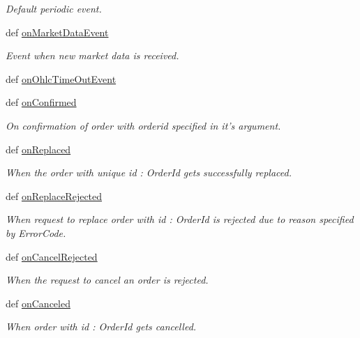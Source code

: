 \begin{DoxyCompactItemize}
\begin{DoxyCompactList}\small\item\em Default periodic event. \end{DoxyCompactList}\item 
def \hyperlink{classmuTradePyBase_1_1CustomStrategy_a918b835dffeef7990e956782842e5343}{on\-Market\-Data\-Event}
\begin{DoxyCompactList}\small\item\em Event when new market data is received. \end{DoxyCompactList}\item 
def \hyperlink{classmuTradePyBase_1_1CustomStrategy_a905f984d6323fafcc385c715441bea27}{on\-Ohlc\-Time\-Out\-Event}
\item 
def \hyperlink{classmuTradePyBase_1_1CustomStrategy_ab64f3133cb5b77c3b1d921759d5911e2}{on\-Confirmed}
\begin{DoxyCompactList}\small\item\em On confirmation of order with orderid specified in it's argument. \end{DoxyCompactList}\item 
def \hyperlink{classmuTradePyBase_1_1CustomStrategy_ad3f6cce49c42ecf283febf72fcaa5931}{on\-Replaced}
\begin{DoxyCompactList}\small\item\em When the order with unique id \-: Order\-Id gets successfully replaced. \end{DoxyCompactList}\item 
def \hyperlink{classmuTradePyBase_1_1CustomStrategy_a90185b4d9a19d02a2d6f3add49367d37}{on\-Replace\-Rejected}
\begin{DoxyCompactList}\small\item\em When request to replace order with id \-: Order\-Id is rejected due to reason specified by Error\-Code. \end{DoxyCompactList}\item 
def \hyperlink{classmuTradePyBase_1_1CustomStrategy_ae9f6ff26aefcfa95d28eb331b2636349}{on\-Cancel\-Rejected}
\begin{DoxyCompactList}\small\item\em When the request to cancel an order is rejected. \end{DoxyCompactList}\item 
def \hyperlink{classmuTradePyBase_1_1CustomStrategy_a5f62cf9ef5b4d4565a9d55ab84ba7ec5}{on\-Canceled}
\begin{DoxyCompactList}\small\item\em When order with id \-: Order\-Id gets cancelled. \end{DoxyCompactList}\item 

\end{DoxyCompactItemize}
